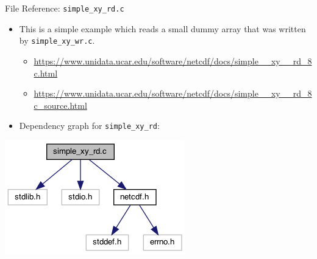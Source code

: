 \documentclass[compress,11pt,xcolor=svgnames,aspectratio=169]{beamer}
\begin{document}
\begin{frame}[fragile]{File Reference: \texttt{simple\_xy\_rd.c}}

\begin{itemize}

  \item This is a simple example which reads a small dummy array that was written by \verb|simple_xy_wr.c|. \\[0.3cm]

    \begin{itemize}
      \item {\tiny \url{https://www.unidata.ucar.edu/software/netcdf/docs/simple__xy__rd_8c.html}}\\[0.3cm]
      \item {\tiny \url{https://www.unidata.ucar.edu/software/netcdf/docs/simple__xy__rd_8c_source.html}}\\[0.4cm]
    \end{itemize}

  \item Dependency graph for \verb|simple_xy_rd|:

\end{itemize}

\begin{center}
\includegraphics[scale=0.5]{fig/simple__xy__rd_8c__incl}
\end{center}

\end{frame}
\end{document}
